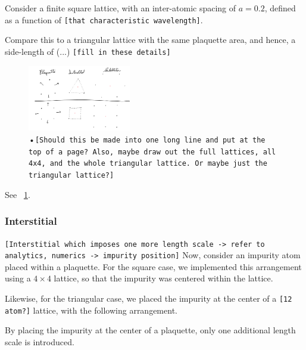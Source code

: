 \documentclass[aps,pra,superscriptaddress,twocolumn]{revtex4-1}
\newcommand{\fref}[1]{\text{Fig.}~\ref{#1}}
\newcommand{\commentSB}[1]{\texttt{\color{blue}[#1]}}
\newcommand{\commentSO}[1]{\texttt{\color{orange}[#1]}}
\newcommand{\commentTP}[1]{\texttt{\color{green}[#1]}}
\begin{document}
Consider a finite square lattice, with an inter-atomic spacing of $a = 0.2$, defined as a function of \commentSB{that characteristic wavelength}. 

Compare this to a triangular lattice with the same plaquette area, and hence, a side-length of (...) 
\commentSB{fill in these details}

\begin{figure}
    \centering
    \includegraphics[width=0.4\textwidth]{figures/triangle_and_square.png} 
    \caption{•\commentSB{Should this be made into one long line and put at the top of a page? Also, maybe draw out the full lattices, all 4x4, and the whole triangular lattice. Or maybe just the triangular lattice?}}
    \label{fig:triangle_and_square}
\end{figure}

See \fref{fig:triangle_and_square}.


\subsubsection{Interstitial}
\commentSO{Interstitial which imposes one more length scale -> refer to analytics, numerics -> impurity position}
Now, consider an impurity atom placed within a plaquette. For the square case, we implemented this arrangement using a $4\times 4$ lattice, so that the impurity was centered within the lattice. 


Likewise, for the triangular case, we placed the impurity at the center of a \commentSB{12 atom?} lattice, with the following arrangement. 


By placing the impurity at the center of a plaquette, only one additional length scale is introduced. 
\end{document}
